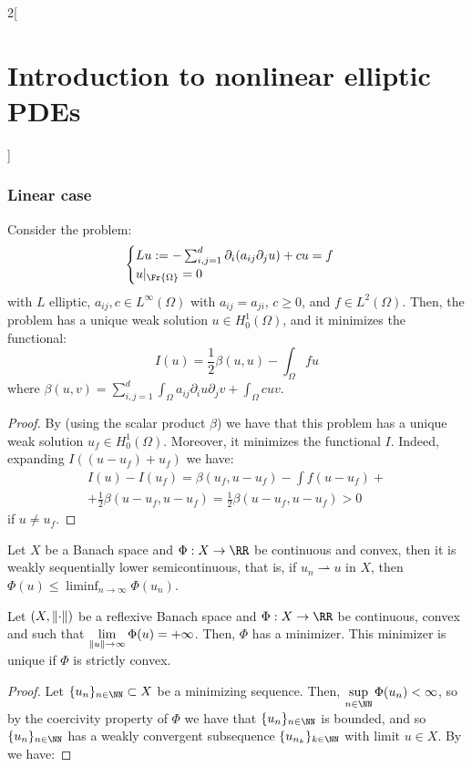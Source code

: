 \documentclass[../../../main_math.tex]{subfiles}
\begin{document}
\begin{multicols}{2}[\section{Introduction to nonlinear elliptic PDEs}]
  \subsubsection{Linear case}
  \begin{proposition}
    Consider the problem:
    \begin{equation}\label{INEPDE:var_linear_problem}
      \begin{cases}
        Lu:=-\sum_{i,j=1}^d \partial_i(a_{ij}\partial_j u)+cu=f \\
        u|_{\Fr{\Omega}}=0
      \end{cases}
    \end{equation}
    with $L$ elliptic, $a_{ij},c\in L^\infty(\Omega)$ with $a_{ij}= a_{ji}$, $c\geq 0$, and $f\in L^2(\Omega)$. Then, the problem has a unique weak solution $u\in H_0^1(\Omega)$, and it minimizes the functional:
    $$
      I(u)=\frac{1}{2}\beta(u,u)-\int_\Omega fu
    $$
    where $\displaystyle\beta(u,v)=\sum_{i,j=1}^d\int_\Omega a_{ij}\partial_i u\partial_j v + \int_\Omega cuv$.
  \end{proposition}
  \begin{proof}
    By  (using the scalar product $\beta$) we have that this problem has a unique weak solution $u_f\in H_0^1(\Omega)$. Moreover, it minimizes the functional $I$. Indeed, expanding $I((u-u_f)+u_f)$ we have:
    \begin{multline*}
      I(u)-I(u_f)=\beta(u_f,u-u_f)-\int f(u-u_f)+\\
      +\frac{1}{2}\beta(u-u_f,u-u_f)= \frac{1}{2} \beta(u-u_f,u-u_f)>0
    \end{multline*}
    if $u\ne u_f$.
  \end{proof}
  \begin{lemma}\label{INEPDE:optimization}
    Let $X$ be a Banach space and $\Phi:X\to \RR$ be continuous and convex, then it is weakly sequentially lower semicontinuous, that is, if $u_n\rightharpoonup u$ in $X$, then $\displaystyle\Phi(u)\leq \liminf_{n\to\infty}\Phi(u_n)$.
  \end{lemma}
  \begin{theorem}
    Let $(X,\norm{\cdot})$ be a reflexive Banach space and $\Phi:X\to \RR$ be continuous, convex and such that $\displaystyle \lim_{\norm{u}\to\infty}\Phi(u)=+\infty$. Then, $\Phi$ has a minimizer. This minimizer is unique if $\Phi$ is strictly convex.
  \end{theorem}
  \begin{proof}
    Let $\{u_n\}_{n\in\NN}\subset X$ be a minimizing sequence. Then, $\displaystyle\sup_{n\in\NN}\Phi(u_n)<\infty$, so by the coercivity property of $\Phi$ we have that $\{u_n\}_{n\in\NN}$ is bounded, and so $\{u_n\}_{n\in\NN}$ has a weakly convergent subsequence $\{u_{n_k}\}_{k\in\NN}$ with limit $u\in X$. By  we have:

\end{proof}
\end{multicols}
\end{document}
